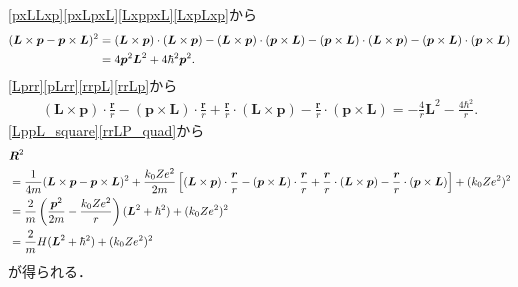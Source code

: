 \eqref{pxLLxp}\eqref{pxLpxL}\eqref{LxppxL}\eqref{LxpLxp}から
\begin{align}
  (\boldsymbol{L}\times\boldsymbol{p} - \boldsymbol{p}\times\boldsymbol{L})^2
  & = (\boldsymbol{L}\times\boldsymbol{p})\cdot(\boldsymbol{L}\times\boldsymbol{p}) - (\boldsymbol{L}\times\boldsymbol{p})\cdot(\boldsymbol{p}\times\boldsymbol{L}) - (\boldsymbol{p}\times\boldsymbol{L})\cdot(\boldsymbol{L}\times\boldsymbol{p}) - (\boldsymbol{p}\times\boldsymbol{L})\cdot(\boldsymbol{p}\times\boldsymbol{L})\notag\\
  & = 4\boldsymbol{p}^2\boldsymbol{L}^2 + 4\hbar^2\boldsymbol{p}^2.\label{LppL_square}
\end{align}
\eqref{Lprr}\eqref{pLrr}\eqref{rrpL}\eqref{rrLp}から
\begin{align}
  (\boldsymbol{L}\times\boldsymbol{p})\cdot\frac{\boldsymbol{r}}{r} - (\boldsymbol{p}\times\boldsymbol{L})\cdot\frac{\boldsymbol{r}}{r} + \frac{\boldsymbol{r}}{r}\cdot(\boldsymbol{L}\times\boldsymbol{p}) - \frac{\boldsymbol{r}}{r}\cdot(\boldsymbol{p}\times\boldsymbol{L}) = - \frac{4}{r}\boldsymbol{L}^2 - \frac{4\hbar^2}{r}.\label{rrLP_quad}
\end{align}
\eqref{LppL_square}\eqref{rrLP_quad}から
\begin{align}
  & \boldsymbol{R}^2 \\
  & = \frac{1}{4m}(\boldsymbol{L}\times\boldsymbol{p} - \boldsymbol{p}\times\boldsymbol{L})^2 + \frac{k_0Ze^2}{2m}\left[(\boldsymbol{L}\times\boldsymbol{p})\cdot\frac{\boldsymbol{r}}{r} - (\boldsymbol{p}\times\boldsymbol{L})\cdot\frac{\boldsymbol{r}}{r} + \frac{\boldsymbol{r}}{r}\cdot(\boldsymbol{L}\times\boldsymbol{p}) - \frac{\boldsymbol{r}}{r}\cdot(\boldsymbol{p}\times\boldsymbol{L})\right] + (k_0Ze^2)^2\notag\\
  & = \frac{2}{m}\left(\frac{\boldsymbol{p}^2}{2m} - \frac{k_0Ze^2}{r}\right)(\boldsymbol{L}^2 + \hbar^2) + (k_0Ze^2)^2\notag\\
  & = \frac{2}{m}H(\boldsymbol{L}^2 + \hbar^2) + (k_0Ze^2)^2
\end{align}
が得られる．


